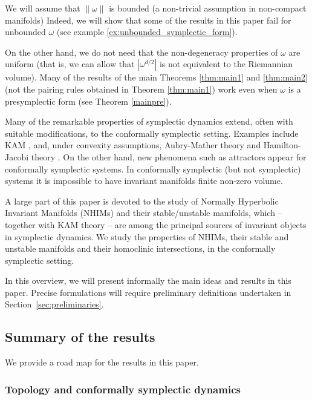 \documentclass[11pt]{amsart}
\theoremstyle{definition}
\theoremstyle{remark}
\numberwithin{equation}{section}
\begin{document}
We will assume  that $\|\omega\|$ is bounded (a non-trivial
assumption in non-compact manifolds)
Indeed, we will show that some  of the  results in this paper  fail
for unbounded $\omega$ (see example \ref{ex:unbounded_symplectic_form}).


On the other hand, we do not need that the non-degeneracy properties of
$\omega$ are uniform (that is, we can allow that $|\omega^{ d/2}|$
is not equivalent to the Riemannian volume). Many of the results of the main Theorems \ref{thm:main1} and \ref{thm:main2}
(not the pairing rules obtained in Theorem \ref{thm:main1})  work even when $\omega$ is a presymplectic form (see Theorem \ref{mainpre}).



Many of the remarkable properties of symplectic dynamics extend, often with suitable modifications,
 to the conformally symplectic setting.  Examples include KAM
 \cite{CallejaCL13, CallejaCL22}, and, under convexity assumptions,
 Aubry-Mather theory
 \cite{maro2017aubry}   and Hamilton-Jacobi theory \cite{Gomes08}.
 On the other hand, new phenomena such as attractors appear for conformally
 symplectic systems. In conformally symplectic (but not symplectic)
 systems it is impossible
 to  have invariant manifolds finite non-zero volume.

 \bigskip
 A large part of this paper is devoted to the study of Normally Hyperbolic Invariant Manifolds (NHIMs) and their stable/unstable manifolds,
 which -- together with KAM theory -- are among the principal sources of invariant objects in symplectic dynamics.
 We study the properties of NHIMs, their stable and unstable manifolds and their homoclinic intersections,  in the conformally symplectic setting.

\medskip

 In this overview, we will present informally the main ideas and results in
 this paper. Precise formulations will require preliminary definitions
 undertaken in Section~\ref{sec:preliminaries}.





\subsection{Summary of the results}
We provide a road map for the
results in this paper.


 \subsubsection{Topology and conformally symplectic dynamics}
\end{document}
